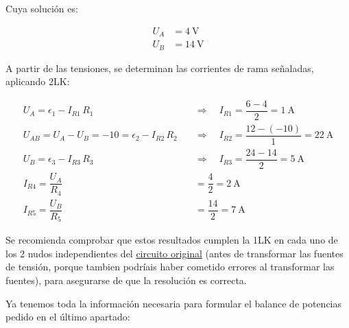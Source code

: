 \begin{example}
        \vspace{5mm}
        Cuya solución es:

        \vspace{-5mm}
          \begin{align*}
            U_A&=\qty{4}{\volt}\\
            U_B&=\qty{14}{\volt}
          \end{align*}

          A partir de las tensiones, se determinan las corrientes de rama señaladas, aplicando 2LK:


\vspace{-5mm}
\begin{align*}
  U_A=\epsilon_1-I_{R1}\,R_1 \quad &\Rightarrow \quad {I_{R1}=\dfrac{6-4}{2}= \qty{1}{\ampere}}\\
  U_{AB}=U_A-U_B=-10=\epsilon_2 - I_{R2}\, R_2 \quad &\Rightarrow \quad I_{R2} = \dfrac{12-(-10)}{1}= \qty{22}{\ampere}\\
  U_B=\epsilon_3-I_{R3}\,R_3 \quad &\Rightarrow \quad I_{R3}=\dfrac{24-14}{2}= \qty{5}{\ampere}\\
  I_{R4}=\dfrac{U_A}{R_4}&=\dfrac{4}{2}= \qty{2}{\ampere}\\
  I_{R5}=\dfrac{U_B}{R_5}&=\dfrac{14}{2}= \qty{7}{\ampere}
\end{align*}

\vspace{2mm}
Se recomienda comprobar que estos resultados cumplen la 1LK en cada uno de los 2 nudos independientes del \underline{circuito original} (antes de transformar las fuentes de tensión, porque tambien podríais haber cometido errores al transformar las fuentes), para asegurarse de que la resolución es correcta.

\vspace{4mm}
Ya tenemos toda la información necesaria para formular el balance de potencias pedido en el último apartado:


\end{example}
